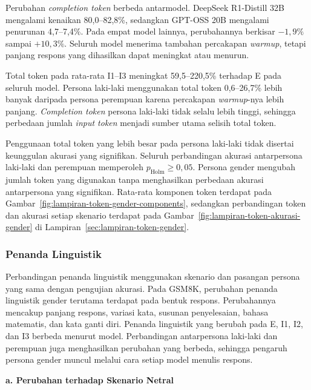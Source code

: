 Perubahan \textit{completion token} berbeda antarmodel. DeepSeek
R1-Distill 32B mengalami kenaikan 80,0--82,8\%, sedangkan GPT-OSS 20B
mengalami penurunan 4,7--7,4\%. Pada empat model lainnya, perubahannya
berkisar $-1{,}9\%$ sampai $+10{,}3\%$. Seluruh model menerima tambahan
percakapan \textit{warmup}, tetapi panjang respons yang dihasilkan dapat
meningkat atau menurun.

Total token pada rata-rata I1--I3 meningkat 59,5--220,5\% terhadap E pada
seluruh model. Persona laki-laki menggunakan total token 0,6--26,7\% lebih
banyak daripada persona perempuan karena percakapan \textit{warmup}-nya lebih
panjang. \textit{Completion token} persona laki-laki tidak selalu lebih
tinggi, sehingga perbedaan jumlah \textit{input token} menjadi sumber utama
selisih total token.

Penggunaan total token yang lebih besar pada persona laki-laki tidak disertai
keunggulan akurasi yang signifikan. Seluruh perbandingan akurasi antarpersona
laki-laki dan perempuan memperoleh
$p_{\mathrm{Holm}}\geq 0{,}05$. Persona gender mengubah jumlah token yang
digunakan tanpa menghasilkan perbedaan akurasi antarpersona yang signifikan.
Rata-rata komponen token terdapat pada
Gambar~\ref{fig:lampiran-token-gender-components}, sedangkan perbandingan
token dan akurasi setiap skenario terdapat pada
Gambar~\ref{fig:lampiran-token-akurasi-gender} di
Lampiran~\ref{sec:lampiran-token-gender}.

\subsubsection{Penanda Linguistik}
\label{subsubsec:penanda-gender-gsm8k}

Perbandingan penanda linguistik menggunakan skenario dan pasangan persona yang
sama dengan pengujian akurasi. Pada GSM8K, perubahan penanda linguistik gender
terutama terdapat pada bentuk respons. Perubahannya mencakup panjang respons,
variasi kata, susunan penyelesaian, bahasa matematis, dan kata ganti diri.
Penanda linguistik yang berubah pada E, I1, I2, dan I3 berbeda menurut model. Perbandingan
antarpersona laki-laki dan perempuan juga menghasilkan perubahan
yang berbeda, sehingga pengaruh persona gender muncul melalui cara setiap model
menulis respons.

\par\noindent\textbf{a. Perubahan terhadap Skenario Netral}\par

